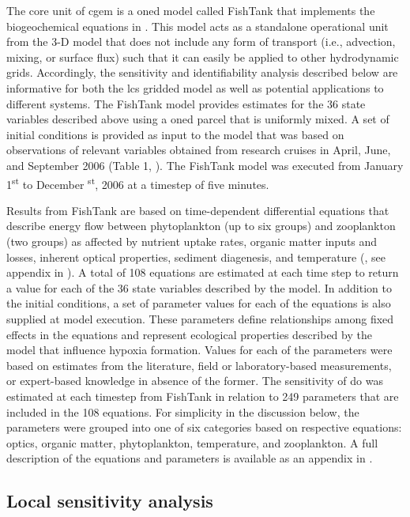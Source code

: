 \documentclass[letterpaper,12pt,oneside]{article}\usepackage[]{graphicx}\usepackage[]{color}
\begin{document}
The core unit of \ac{cgem} is a \ac{oned} model called FishTank that implements the biogeochemical equations in \citet{Eldridge10}.  This model acts as a standalone operational unit from the 3-D model that does not include any form of transport (i.e., advection, mixing, or surface flux) such that it can easily be applied to other hydrodynamic grids.  Accordingly, the sensitivity and identifiability analysis described below are informative for both the \ac{lcs} gridded model as well as potential applications to different systems.  The FishTank model provides estimates for the 36 state variables described above using a \ac{oned} parcel that is uniformly mixed.  A set of initial conditions is provided as input to the model that was based on observations of relevant variables obtained from research cruises in April, June, and September 2006 (Table 1, \citet{Murrell14}).  The FishTank model was executed from January 1\textsuperscript{st} to December \textsuperscript{st}, 2006 at a timestep of five minutes.  

Results from FishTank are based on time-dependent differential equations that describe energy flow between phytoplankton (up to six groups) and zooplankton (two groups) as affected by nutrient uptake rates, organic matter inputs and losses, inherent optical properties, sediment diagenesis, and temperature (\citealt{Penta08,Eldridge10}, see appendix in ).  A total of 108 equations are estimated at each time step to return a value for each of the 36 state variables described by the model.  In addition to the initial conditions, a set of parameter values for each of the equations is also supplied at model execution.  These parameters define relationships among fixed effects in the equations and represent ecological properties described by the model that influence hypoxia formation.  Values for each of the parameters were based on estimates from the literature, field or laboratory-based measurements, or expert-based knowledge in absence of the former.  The sensitivity of \ac{do} was estimated at each timestep from FishTank in relation to 249 parameters that are included in the 108 equations.  For simplicity in the discussion below, the parameters were grouped into one of six categories based on respective equations: optics, organic matter, phytoplankton, temperature, and zooplankton.  A full description of the equations and parameters is available as an appendix in .  
\subsection{Local sensitivity analysis}
\end{document}
